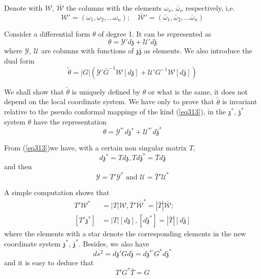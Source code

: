  Denote with $\mathscr{W}$, $\bar {\mathscr{W}}$ the columns with the
 elements $\omega_\nu$, $\bar{\omega}_\nu$ respectively, i,e. 
 \begin{equation*}
\mathscr{W}' = (\omega_1, \omega_2, \ldots \omega_n); \quad \bar
        {\mathscr{W}}' = (\bar {\omega}_1, \bar {\omega}_2, \ldots
        \bar {\omega}_n) \tag{316}\label{eq316} 
 \end{equation*} 
 
 Consider a differential form $\theta$ of degree 1. It can be
 represented as  
 \begin{equation*}
\theta = \mathscr{Y}' d \mathfrak{z} + \mathscr{U}' d
\bar{\mathfrak{z}} \tag{317}\label{eq317} 
 \end{equation*}  
 where $\mathscr{Y}$, $\mathscr{U}$ are columns with functions of
 $\mathfrak{z} \bar{\mathfrak{z}}$ as elements. We also introduce the
 dual form  
 \begin{equation*}
\tilde{\theta } = |G| (\mathscr{Y}' \bar{G}^{-1} \mathscr{W} [d
  \mathfrak{z}] + \mathscr{U}' G^{-1} \mathscr{W} [d
  \bar{\mathfrak{z}}]) \tag{318}\label{eq318} 
 \end{equation*} 
 
 We shall show that $\tilde{\theta}$ is uniquely defined by $\theta $
 or what is the same, it does not depend on the local coordinate
 system. We have only to prove that $\tilde{\theta}$ is invariant
 relative to the pseudo conformal mappings of the kind (\ref{eq313}), in the
 $\mathfrak{z}^*$, $\bar{\mathfrak{z}}^*$ system $\theta$ have the
 representation  
 $$
 \theta = \mathscr{Y}^{*'}  d \mathfrak{z}^*  + \mathscr{U}^{*'} d
 \bar{\mathfrak{z}}^* 
 $$
 
 From (\ref{eq313})\pageoriginale we have, with a certain non singular
 matrix $T$,  
 $$
 d \mathfrak{z}^* = T d \mathfrak{z}, T d \bar{\mathfrak{z}} ^* = \bar
 {T} d \bar{\mathfrak{z}} 
 $$
 and then 
 $$
 \mathscr{Y} = T' \mathscr{Y}^*  \text{ and } \mathscr{U} = \bar {T}'
 \mathscr{U} ^* 
 $$
 
 A simple computation shows that 
 \begin{align*}
T' \mathscr{W}^* & = |T| \mathscr{W},  \bar {T}' \bar {\mathscr{W}}^*
= |\bar {T}| \bar{\mathscr{W}}; \\ 
[T' \mathfrak{z}^*] & = |T| [d \mathfrak{z}],  [d \bar
  {\mathfrak{z}}^*] = |\bar {T}| [d \bar{\mathfrak{z}}]  
 \end{align*} 
 where the elements with a star denote the corresponding elements in
 the new coordinate system $\mathfrak{z}^*$, $\bar
 {\mathfrak{z}}^*$. Besides, we also have  
 $$
 d s^2 = d \mathfrak{z}' G d \bar {\mathfrak{z}} = d
 \mathfrak{z}^{*'} G^{*} d \bar {\mathfrak{z}}^* 
 $$
 and it is easy to deduce that 
 $$
 T' G^* \bar {T}  = G
 $$
 
